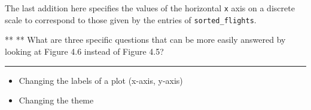 \documentclass[]{tufte-book}
\providecommand{\tightlist}{%
  \setlength{\itemsep}{0pt}\setlength{\parskip}{0pt}}
\begin{document}
The last addition here specifies the values of the horizontal \texttt{x}
axis on a discrete scale to correspond to those given by the entries of
\texttt{sorted\_flights}.

** ** What are three specific questions that can be more easily answered
by looking at Figure 4.6 instead of Figure 4.5?

\begin{center}\rule{0.5\linewidth}{\linethickness}\end{center}

\begin{itemize}
\tightlist
\item
  Changing the labels of a plot (x-axis, y-axis)
\item
  Changing the theme
\end{itemize}


\end{document}
